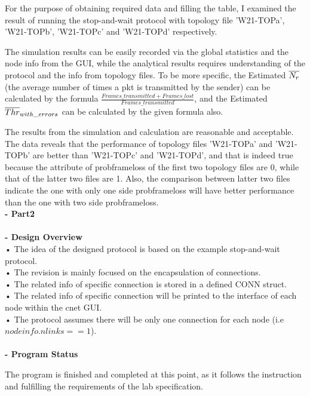\documentclass[12pt]{article}
\begin{document}
For the purpose of obtaining required data and filling the table, I examined the result of running the stop-and-wait protocol with topology file 'W21-TOPa', 'W21-TOPb', 'W21-TOPc' and 'W21-TOPd' respectively.

The simulation results can be easily recorded via the global statistics and the node info from the GUI, while the analytical results requires understanding of the protocol and the info from topology files. To be more specific, the Estimated $\overline{N_r}$ (the average number of times a pkt is transmitted by the
sender) can be calculated by the formula $\frac{Frames\_transmitted + Frames\_lost}{Frames\_transmitted}$, and the Estimated $\overline{Thr}_{with\_errors}$ can be calculated by the given formula also.

The results from the simulation and calculation are reasonable and acceptable. The data reveals that the performance of topology files 'W21-TOPa' and 'W21-TOPb' are better than 'W21-TOPc' and 'W21-TOPd', and that is indeed true because the attribute of probframeloss of the first two topology files are 0, while that of the latter two files are 1. Also, the comparison between latter two files indicate the one with only one side probframeloss will have better performance than the one with two side probframeloss.
~\\


\textbf{\large - Part2}\\
\\{\textbf{- Design Overview}}\\
• The idea of the designed protocol is based on the example stop-and-wait protocol.\\
• The revision is mainly focused on the encapsulation of connections.\\
• The related info of specific connection is stored in a defined CONN struct.\\
• The related info of specific connection will be printed to the interface of each node within the cnet GUI.\\
• The protocol assumes there will be only one connection for each node (i.e $nodeinfo.nlinks == 1$).\\
\\{\textbf{- Program Status}}

The program is finished and completed at this point, as it follows the instruction and fulfilling the requirements of the lab specification.
\end{document}
